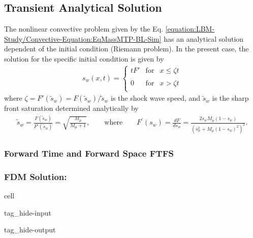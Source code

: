 \documentclass[letterpaper,10pt,english,openany,oneside]{jupyterBook}
\begin{document}
\subsection{Transient Analytical Solution}
\label{\detokenize{LBM-Study/Convective-Equation:transient-analytical-solution}}
\sphinxAtStartPar
The non\sphinxhyphen{}linear convective problem given by the Eq. \eqref{equation:LBM-Study/Convective-Equation:EqMassMTP-BL-Sim} has an analytical solution dependent of the initial condition (Riemann problem). In the present case, the solution for the specific initial condition is given by
\begin{equation*}
\begin{split}
s_{w}(x,t)= \left\{  \begin{array}{ccc}
    t \displaystyle F' & \textrm{for} & x\leq \zeta t \\
    & & \\
    0 & \textrm{for} & x >  \zeta t \\ 
\end{array} \right.
\end{split}
\end{equation*}
\sphinxAtStartPar
where \(\zeta=F'(\tilde{s}_{w})=F(\tilde{s}_{w})/\tilde{s}_{w}\) is the shock wave speed, and \(\tilde{s}_{w}\) is the sharp front saturation determined analytically by
\begin{equation*}
\begin{split}
\tilde{s}_{w}=\displaystyle\frac{F(\tilde{s}_{w})}{F'(\tilde{s}_{w})}=\sqrt{\displaystyle\frac{M_{\mu}}{M_{\mu}+1}}, \quad \quad \textrm{where} \quad \quad F^{'}(s_{w})=\frac{dF}{ds_{w}}=\frac{2s_{w}M_{\mu}(1-s_{w})}{(s_{w}^{2}+M_{\mu}(1-s_{w})^{2})^{2}}.
\end{split}
\end{equation*}

\subsubsection{Forward Time and Forward Space \sphinxhyphen{} FTFS}
\label{\detokenize{LBM-Study/Convective-Equation:id1}}

\subsubsection{FDM Solution:}
\label{\detokenize{LBM-Study/Convective-Equation:fdm-solution}}
\begin{sphinxuseclass}{cell}
\begin{sphinxuseclass}{tag_hide-input}
\begin{sphinxuseclass}{tag_hide-output}
\end{sphinxuseclass}
\end{sphinxuseclass}
\end{sphinxuseclass}
\end{document}
